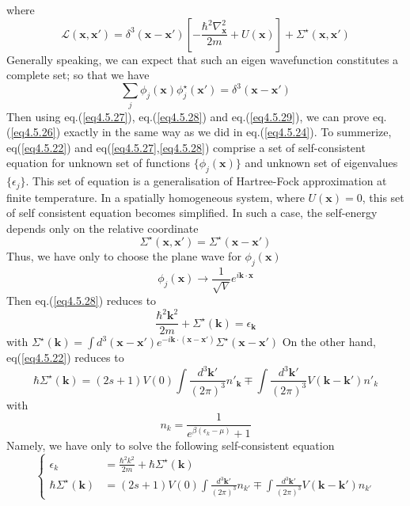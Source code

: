 where
\begin{equation}\label{eq4.5.28}
\mathscr{L}(\mathbf{x},\mathbf{x}')=\delta^3(\mathbf{x}-\mathbf{x}')\left[ -\frac{\hbar^2\nabla^2_\mathbf{x}}{2m}+U(\mathbf{x}) \right]+ \Sigma^\star (\mathbf{x},\mathbf{x}')
\end{equation}
Generally speaking, we can expect that such an eigen wavefunction constitutes a complete set; so that we have 
\begin{equation}\label{eq4.5.29}
\sum_j\phi_j(\mathbf{x}) \phi_j^\star(\mathbf{x}')=\delta^3(\mathbf{x}-\mathbf{x}')
\end{equation}
Then using eq.(\ref{eq4.5.27}), eq.(\ref{eq4.5.28}) and eq.(\ref{eq4.5.29}), we can prove eq.(\ref{eq4.5.26}) exactly in the same way as we did in eq.(\ref{eq4.5.24}).
To summerize, eq(\ref{eq4.5.22}) and eq(\ref{eq4.5.27},\ref{eq4.5.28}) comprise a set of self-consistent equation for unknown set of functions $\{ \phi_j(\mathbf{x})\}$ and unknown set of eigenvalues $\{ \epsilon_j\}$.
This set of equation is a generalisation of Hartree-Fock approximation at finite temperature.
In a spatially homogeneous system, where $U(\mathbf{x})=0$, this set of self consistent equation becomes simplified.
In such a case, the self-energy depends only on the relative coordinate
\[
\Sigma^\star(\mathbf{x},\mathbf{x}')=\Sigma^\star(\mathbf{x}-\mathbf{x}')
\]
Thus, we have only to choose the plane wave for $\phi_j(\mathbf{x})$
\[
\phi_j(\mathbf{x})\rightarrow \frac{1}{\sqrt{V}}e^{i\mathbf{k} \cdot \mathbf{x}}
\]
Then eq.(\ref{eq4.5.28}) reduces to 
\begin{equation}
\frac{\hbar^2 \mathbf{k}^2}{2m}+\Sigma^\star (\mathbf{k})=\epsilon_{\mathbf{k}}
\end{equation}
with $\Sigma^\star (\mathbf{k})=\int d^3(\mathbf{x}-\mathbf{x}') e^{-i\mathbf{k}\cdot (\mathbf{x}-\mathbf{x'})} \Sigma^\star (\mathbf{x}-\mathbf{x}')$
On the other hand, eq(\ref{eq4.5.22}) reduces to 
\begin{equation}
\hbar \Sigma^\star (\mathbf{k})=(2s+1)V(0)\int \frac{d^3\mathbf{k}'}{(2\pi)^3} n'_\mathbf{k}\mp\int \frac{d^3\mathbf{k}'}{(2\pi)^3} V(\mathbf{k}-\mathbf{k}') n'_k
\end{equation}
with 
\begin{equation}\tag{4.5.30$^\prime$}
n_k=\frac{1}{e^{\beta(\epsilon_k-\mu)}+1}
\end{equation}
Namely, we have only to solve the following self-consistent equation
\begin{equation}\label{eq4.5.31}
\left\{
\begin{aligned}
\epsilon_k&=\frac{\hbar^2 k^2}{2m}+\hbar\Sigma^\star(\mathbf{k})\\
\hbar \Sigma^\star(\mathbf{k})&=(2s+1)V(0)\int\frac{d^3\mathbf{k}'}{(2\pi)^3}n_{k'}\mp\int\frac{d^3\mathbf{k}'}{(2\pi)^3}V(\mathbf{k}-\mathbf{k}')n_{k'}
\end{aligned}
\right.
\end{equation}
%




